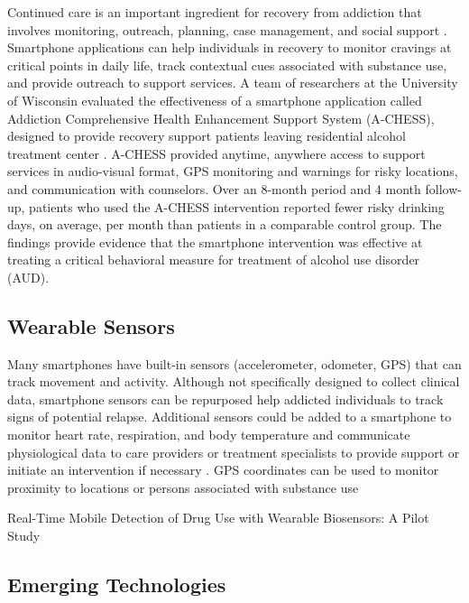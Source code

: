 \documentclass[sigconf]{acmart}
\begin{document}
Continued care is an important ingredient for recovery from addiction that
involves monitoring, outreach, planning, case management, and social support 
\cite{johnson11}. Smartphone applications can help individuals in recovery to 
monitor cravings at critical points in daily life, track contextual cues 
associated with substance use, and provide outreach to support services. A team 
of researchers at the University of Wisconsin evaluated the effectiveness of a
smartphone application called Addiction Comprehensive Health Enhancement Support 
System (A-CHESS), designed to provide recovery support patients leaving 
residential alcohol treatment center \cite{gustafson14}. A-CHESS provided anytime, 
anywhere access to support services in audio-visual format, GPS monitoring and 
warnings for risky locations, and communication with counselors. Over an 8-month
period and 4 month follow-up, patients who used the A-CHESS intervention reported
fewer risky drinking days, on average, per month than patients in a comparable
control group. The findings provide evidence that the smartphone intervention was 
effective at treating a critical behavioral measure for treatment of alcohol use 
disorder (AUD). 


\subsection{Wearable Sensors}

Many smartphones have built-in sensors (accelerometer, odometer, GPS) that can 
track movement and activity. Although not specifically designed to collect
clinical data, smartphone sensors can be repurposed help addicted individuals 
to track signs of  potential relapse. Additional sensors could be added to a 
smartphone to monitor heart rate, respiration, and body temperature and 
communicate physiological data to care providers or treatment specialists to
provide support or initiate an intervention if necessary \cite{johnson11}. 
GPS coordinates can be used to monitor proximity to locations or persons 
associated with substance use


Real-Time Mobile Detection of Drug Use with Wearable Biosensors:
A Pilot Study
\cite{carreiro15}

\subsection{Emerging Technologies}
\end{document}
